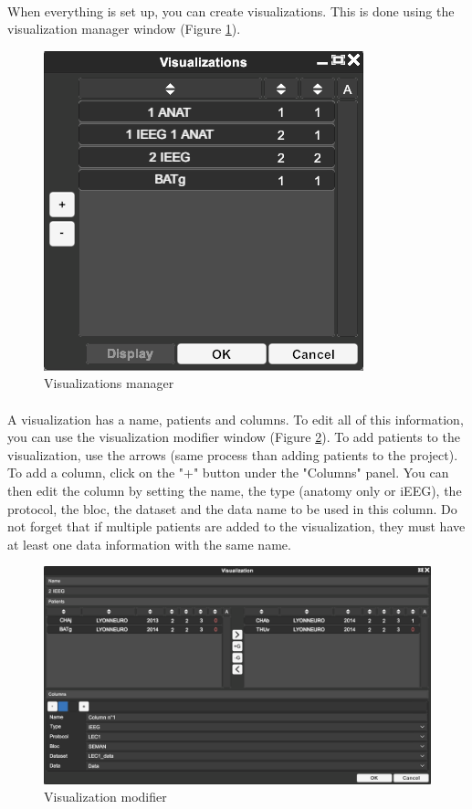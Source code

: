 \documentclass[a4paper]{article}
\begin{document}
\paragraph{} When everything is set up, you can create visualizations. This is done using the visualization manager window (Figure \ref{visuGestionUI}).
\begin{figure}[H]
\begin{center}
\includegraphics[scale=0.5]{VisualizationGestion.png}
\end{center}
\caption{\label{visuGestionUI}Visualizations manager}
\end{figure}
\paragraph{} A visualization has a name, patients and columns. To edit all of this information, you can use the visualization modifier window (Figure \ref{visuModifierUI}). To add patients to the visualization, use the arrows (same process than adding patients to the project). To add a column, click on the "+" button under the "Columns" panel. You can then edit the column by setting the name, the type (anatomy only or iEEG), the protocol, the bloc, the dataset and the data name to be used in this column. Do not forget that if multiple patients are added to the visualization, they must have at least one data information with the same name.
\begin{figure}[H]
\begin{center}
\includegraphics[scale=0.3]{VisualizationModifier.png}
\end{center}
\caption{\label{visuModifierUI}Visualization modifier}
\end{figure}
\end{document}
